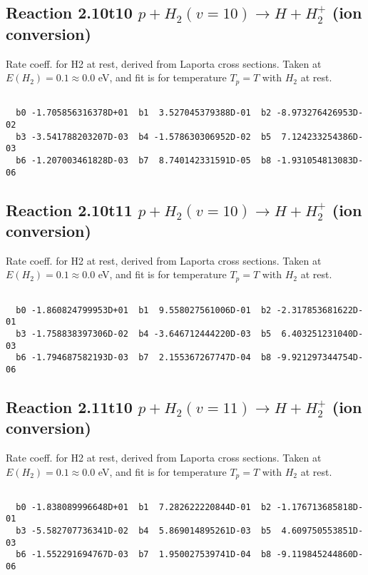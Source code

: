 \subsection{
Reaction 2.10t10
$ p + H_2(v=10) \rightarrow H + H_2^+$ (ion conversion)
}
Rate coeff. for H2 at rest, derived from Laporta cross sections.
Taken at $E(H_2) = 0.1 \approx 0.0$ eV,  and fit is for temperature $T_p=T$ with $H_2$ at rest.

\begin{small}\begin{verbatim}

  b0 -1.705856316378D+01  b1  3.527045379388D-01  b2 -8.973276426953D-02
  b3 -3.541788203207D-03  b4 -1.578630306952D-02  b5  7.124233254386D-03
  b6 -1.207003461828D-03  b7  8.740142331591D-05  b8 -1.931054813083D-06

\end{verbatim}\end{small}

\newpage
\subsection{
Reaction 2.10t11
$ p + H_2(v=10) \rightarrow H + H_2^+$ (ion conversion)
}
Rate coeff. for H2 at rest, derived from Laporta cross sections.
Taken at $E(H_2) = 0.1 \approx 0.0$ eV,  and fit is for temperature $T_p=T$ with $H_2$ at rest.

\begin{small}\begin{verbatim}

  b0 -1.860824799953D+01  b1  9.558027561006D-01  b2 -2.317853681622D-01
  b3 -1.758838397306D-02  b4 -3.646712444220D-03  b5  6.403251231040D-03
  b6 -1.794687582193D-03  b7  2.155367267747D-04  b8 -9.921297344754D-06

\end{verbatim}\end{small}

\newpage
\subsection{
Reaction 2.11t10
$ p + H_2(v=11) \rightarrow H + H_2^+$ (ion conversion)
}
Rate coeff. for H2 at rest, derived from Laporta cross sections.
Taken at $E(H_2) = 0.1 \approx 0.0$ eV,  and fit is for temperature $T_p=T$ with $H_2$ at rest.

\begin{small}\begin{verbatim}

  b0 -1.838089996648D+01  b1  7.282622220844D-01  b2 -1.176713685818D-01
  b3 -5.582707736341D-02  b4  5.869014895261D-03  b5  4.609750553851D-03
  b6 -1.552291694767D-03  b7  1.950027539741D-04  b8 -9.119845244860D-06

\end{verbatim}\end{small}

